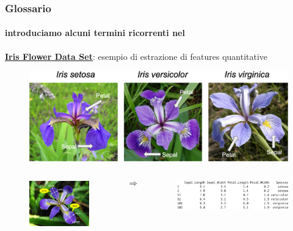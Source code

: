 \begin{frame}

	\frametitle{Glossario}
	\framesubtitle{introduciamo alcuni termini ricorrenti nel \ml}
	
		\href{https://en.wikipedia.org/wiki/Iris_flower_data_set}{\underline{\textbf{Iris Flower Data Set}}}: esempio di estrazione di features quantitative		
		
		\begin{figure}[!htbp]
			\centering
				\includegraphics[width=0.75\linewidth]{images/glossary/iris_petal_sepal.png}
			\end{figure}
		\pause
		
		\begin{columns}
			
			\begin{figure}[!htbp]
				\hspace{15mm}
				\includegraphics[width=0.65\linewidth]{images/glossary/iris_petal_sepal_features.png}
				
			\end{figure}
			
			\pause
			\begin{large}
				\vspace{5mm}
				$$\pmb{\Rightarrow}$$
			\end{large}
			
			\begin{figure}[!htbp]
				\centering
				\includegraphics[width=0.85\linewidth]{images/glossary/iris_3.png}
			\end{figure}	
		\end{columns}


\end{frame}






